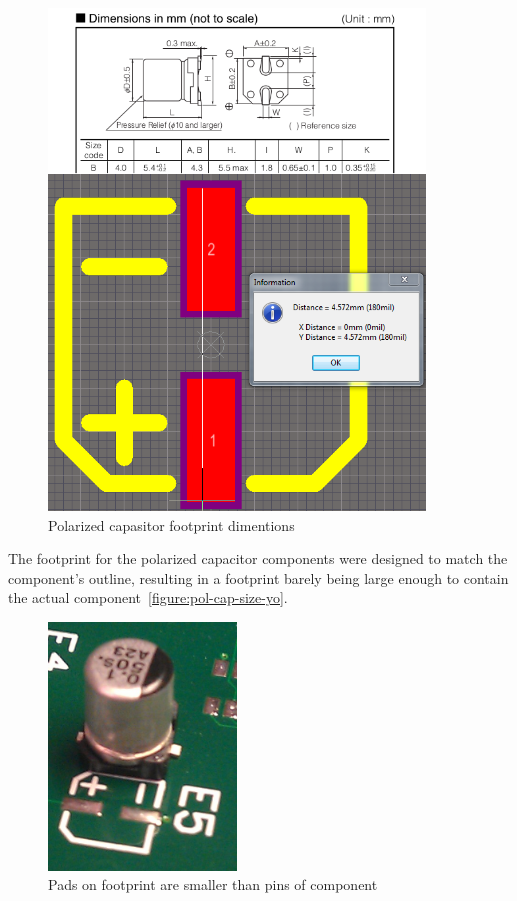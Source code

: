 \begin{figure}
\begin{center}
\includegraphics[width=10cm,keepaspectratio]{pcb/pol_cap_size_footprint_vs_specs.png}
\caption{Polarized capasitor footprint dimentions}
\label{figure:pol-cap-size-yo}
\end{center}
\end{figure}

The footprint for the polarized capacitor components were designed to match the component's outline, resulting in a footprint barely being large enough to contain the actual component~\vref{figure:pol-cap-size-yo}.

\begin{figure}
\begin{center}
\includegraphics[width=5cm,keepaspectratio]{pcb/pol_cap_size_on_board.png}
\caption{Pads on footprint are smaller than pins of component}
\label{figure:pol-cap-size-board}
\end{center}
\end{figure}

